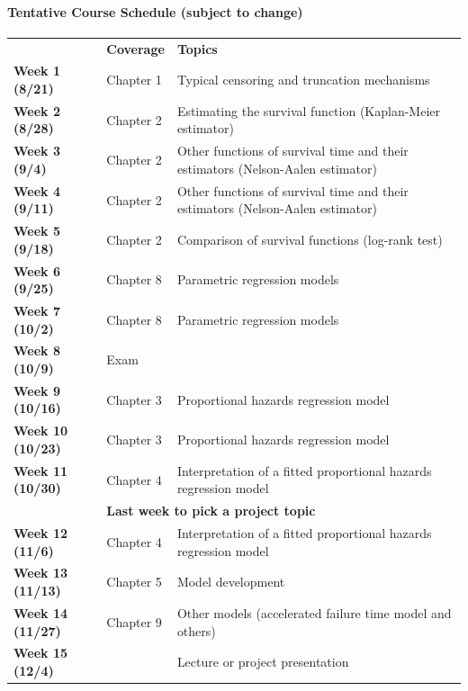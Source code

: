 \documentclass[10pt]{article}
\def\red{\textcolor[rgb]{1,0,0}}
\begin{document}
\paragraph{Tentative Course Schedule (subject to change)}
\begin{center}
\renewcommand{\arraystretch}{1.3}
\begin{tabular}{|p{} p{} p{} |}
\hline
& \textbf{Coverage} & \textbf{Topics} \\
\textbf{Week 1 (8/21)} & Chapter 1 & Typical censoring and truncation mechanisms\\
\textbf{Week 2 (8/28)} & Chapter 2 & Estimating the survival function (Kaplan-Meier estimator)\\
\textbf{Week 3 (9/4)} & Chapter 2 & Other functions of survival time and their estimators (Nelson-Aalen estimator)\\
\textbf{Week 4 (9/11)} & Chapter 2 & Other functions of survival time and their estimators (Nelson-Aalen estimator)\\
\textbf{Week 5 (9/18)} & Chapter 2 & Comparison of survival functions (log-rank test)\\
\textbf{Week 6 (9/25)} & Chapter 8 & Parametric regression models\\
\textbf{Week 7 (10/2)} & Chapter 8 & Parametric regression models\\
\textbf{Week 8 (10/9)} & Exam & \\
\textbf{Week 9 (10/16)} & Chapter 3 & Proportional hazards regression model\\
\textbf{Week 10 (10/23)} & Chapter 3 & Proportional hazards regression model\\
\textbf{Week 11 (10/30)} & Chapter 4 & Interpretation of a fitted proportional hazards regression model\\
& \multicolumn{2}{l}{\red{\textbf{Last week to pick a project topic}}}\\
\textbf{Week 12 (11/6)} & Chapter 4 & Interpretation of a fitted proportional hazards regression model\\
\textbf{Week 13 (11/13)} & Chapter 5 & Model development\\
\textbf{Week 14 (11/27)} & Chapter 9 & Other models (accelerated failure time model and others)\\
\textbf{Week 15 (12/4)} &  & Lecture or project presentation\\
\hline
\end{tabular}
\end{center}
\end{document}
